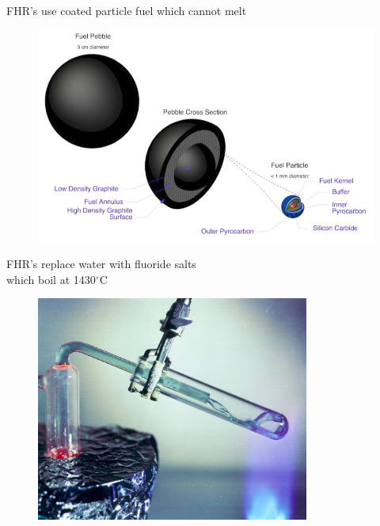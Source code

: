 \documentclass{beamer}
\begin{document}
        \begin{frame}{FHR's use coated particle fuel which cannot melt}
            \begin{figure}
                \centering
                \includegraphics[width=1.0\textwidth]{./img/fhrPebble.png}
                \caption*{}
            \end{figure}
        \end{frame}

        \begin{frame}{FHR's replace water with fluoride salts \\ which boil at 1430$^{\circ}$C}
            \begin{figure}
                \centering
                \includegraphics[width=0.8\textwidth]{./img/fhrFlibe.png}
                \caption*{}
            \end{figure}
        \end{frame}
\end{document}
